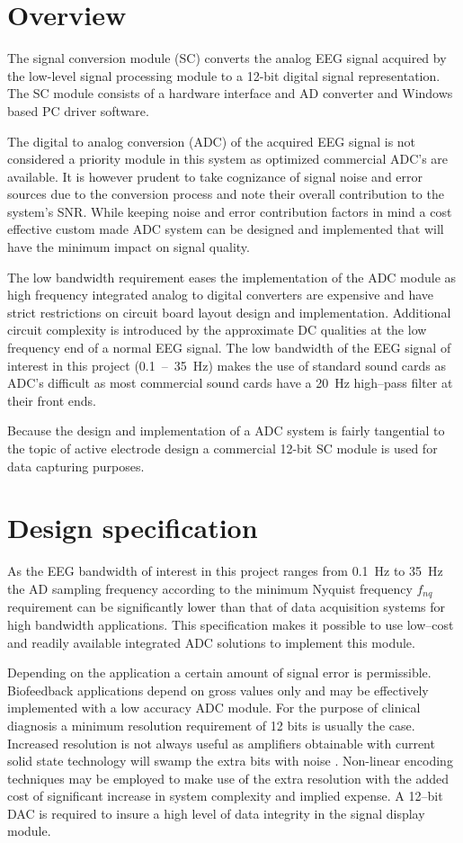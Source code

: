 \section{Overview}
The signal conversion module (SC) converts the analog EEG signal
acquired by the low-level signal processing module to a 12-bit digital
signal representation. The SC module consists of a hardware interface
and AD converter and Windows based PC driver software.

The digital to analog conversion (ADC) of the acquired EEG signal is
not considered a priority module in this system as optimized
commercial ADC's are available. It is however prudent to take
cognizance of signal noise and error sources due to the conversion
process and note their overall contribution to the system's SNR. While
keeping noise and error contribution factors in mind a cost effective
custom made ADC system can be designed and implemented that will have
the minimum impact on signal quality.


The low bandwidth requirement eases the implementation of the ADC
module as high frequency integrated analog to digital converters are
expensive and have strict restrictions on circuit board layout design
and implementation. Additional circuit complexity is introduced by the
approximate DC qualities at the low frequency end of a normal EEG
signal. The low bandwidth of the EEG signal of interest in this project
(0.1~--~35~Hz) makes the use of standard sound cards as ADC's difficult
as most commercial sound cards have a 20~Hz high--pass filter at their
front ends.

Because the design and implementation of a ADC system is fairly
tangential to the topic of active electrode design a commercial 12-bit
SC module is used for data capturing purposes.



\section{Design specification}
As the EEG bandwidth of interest in this project ranges from 0.1~Hz to
35~Hz the AD sampling frequency according to the minimum Nyquist
frequency $f_{nq}$ requirement can be significantly lower than that of
data acquisition systems for high bandwidth applications. This
specification makes it possible to use low--cost and readily available
integrated ADC solutions to implement this module.


Depending on the application a certain amount of signal error is
permissible. Biofeedback applications depend on gross values only and
may be effectively implemented with a low accuracy ADC module. For the
purpose of clinical diagnosis a minimum resolution requirement of 12
bits is usually the case. Increased resolution is not always useful as
amplifiers obtainable with current solid state technology will swamp
the extra bits with noise \cite{pc-eeg}. Non-linear encoding
techniques may be employed to make use of the extra resolution with
the added cost of significant increase in system complexity and
implied expense. A 12--bit DAC is required to insure a high level of
data integrity in the signal display module.

